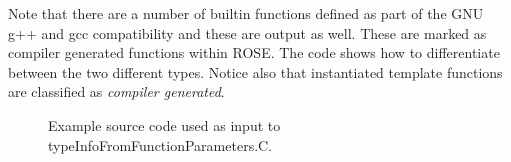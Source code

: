 Note that there are a number of builtin functions defined as part of the
GNU g++ and gcc compatibility and these are output as well.  These are
marked as compiler generated functions within ROSE.  The code shows how
to differentiate between the two different types.  Notice also that 
instantiated template functions are classified as {\em compiler generated}.


\begin{figure}[!h]
{\indent
{\mySmallFontSize


\begin{latexonly}
   
\end{latexonly}

\begin{htmlonly}
   
\end{htmlonly}

}
}
\caption{Example source code used as input to typeInfoFromFunctionParameters.C.}
\label{Tutorial:exampleInputCode_TypeInfoFromFunctionParameters}
\end{figure}


